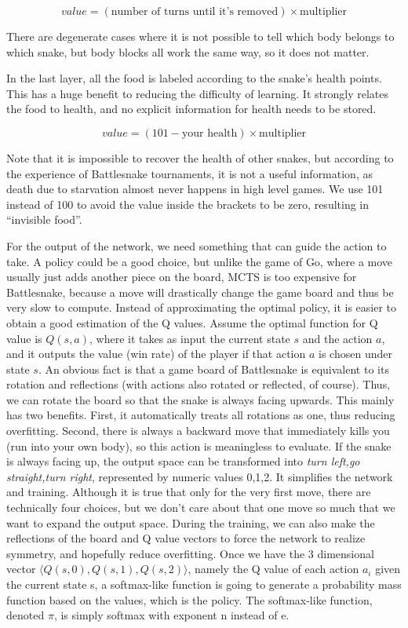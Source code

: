 ﻿\documentclass{article}
\begin{document}
\begin{equation}
  value = (\text{number of turns until it's removed}) \times \text{multiplier}
\end{equation}

There are degenerate cases where it is not possible to tell which body belongs
to which snake, but body blocks all work the same way, so it does not matter.

In the last layer, all the food is labeled according to the snake's health points. This
has a huge benefit to reducing the difficulty of learning. It strongly relates
the food to health, and no explicit information for health needs to be
stored.

\begin{equation}
  value = (101-\text{your health}) \times \text{multiplier}
\end{equation}

Note that it is impossible to recover the health of other snakes, but
according to the experience of Battlesnake tournaments, it is not a useful
information, as death due to starvation almost never happens in high level
games. We use 101 instead of 100 to avoid the value inside the brackets to be
zero, resulting in “invisible food”.

For the output of the network, we need something that can guide the action to
take. A policy could be a good choice, but unlike the game of Go, where a move
usually just adds another piece on the board, MCTS is too expensive for
Battlesnake, because a move will drastically change the game board and thus be very
slow to compute. Instead of approximating the optimal policy, it is easier to
obtain a good estimation of the Q values. Assume the optimal function for Q
value is $Q(s,a)$, where it takes as input the current state $s$ and the action
$a$, and it outputs the value (win rate) of the player if that action $a$ is
chosen under state $s$. An obvious fact is that a game board of Battlesnake is
equivalent to its rotation and reflections (with actions also rotated or
reflected, of course). Thus, we can rotate the board so that the snake is always
facing upwards. This mainly has two benefits. First, it automatically treats all
rotations as one, thus reducing overfitting. Second, there is always a backward
move that immediately kills you (run into your own body), so this action is
meaningless to evaluate. If the snake is always facing up, the output space can
be transformed into \textit{turn left,go straight,turn right}, represented by
numeric values {0,1,2}. It simplifies the network and training. Although it is
true that only for the very first move, there are technically four choices, but
we don’t care about that one move so much that we want to expand the output
space. During the training, we can also make the reflections of the board and Q
value vectors to force the network to realize symmetry, and hopefully reduce
overfitting. Once we have the 3 dimensional vector $\langle Q(s,0),Q(s,1),Q(s,2)
  \rangle$, namely the Q value of each action $a_i$ given the current state s, a
softmax-like function is going to generate a probability mass function based on
the values, which is the policy. The softmax-like function, denoted $\pi$, is simply
softmax with exponent n instead of e.
\end{document}

